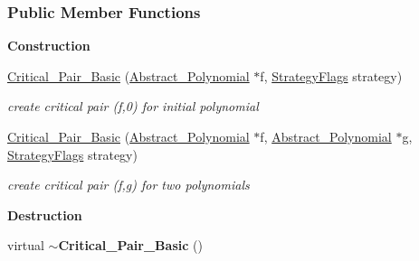 \subsubsection*{Public Member Functions}
\begin{Indent}\textbf{ Construction}\par
\begin{DoxyCompactItemize}
\item 
\mbox{\label{group___g_b_computation_a54a4115589e1c46851167727b5d21578}} 
\hyperlink{group___g_b_computation_a54a4115589e1c46851167727b5d21578}{Critical\+\_\+\+Pair\+\_\+\+Basic} (\hyperlink{group__polygroup_class_abstract___polynomial}{Abstract\+\_\+\+Polynomial} $\ast$f, \hyperlink{group__strategygroup_ga0ee6c8e033547330e6b89929730007f4}{Strategy\+Flags} strategy)
\begin{DoxyCompactList}\small\item\em create critical pair (f,0) for initial polynomial \end{DoxyCompactList}\item 
\mbox{\label{group___g_b_computation_a393b8f7069c8e641a982ba4d704d349c}} 
\hyperlink{group___g_b_computation_a393b8f7069c8e641a982ba4d704d349c}{Critical\+\_\+\+Pair\+\_\+\+Basic} (\hyperlink{group__polygroup_class_abstract___polynomial}{Abstract\+\_\+\+Polynomial} $\ast$f, \hyperlink{group__polygroup_class_abstract___polynomial}{Abstract\+\_\+\+Polynomial} $\ast$g, \hyperlink{group__strategygroup_ga0ee6c8e033547330e6b89929730007f4}{Strategy\+Flags} strategy)
\begin{DoxyCompactList}\small\item\em create critical pair (f,g) for two polynomials \end{DoxyCompactList}\end{DoxyCompactItemize}
\end{Indent}
\begin{Indent}\textbf{ Destruction}\par
\begin{DoxyCompactItemize}
\item 
\mbox{\label{group___g_b_computation_a5a3c9fa67ec45e8f9891d667c1ff43ec}} 
virtual {\bfseries $\sim$\+Critical\+\_\+\+Pair\+\_\+\+Basic} ()
\end{DoxyCompactItemize}
\end{Indent}
